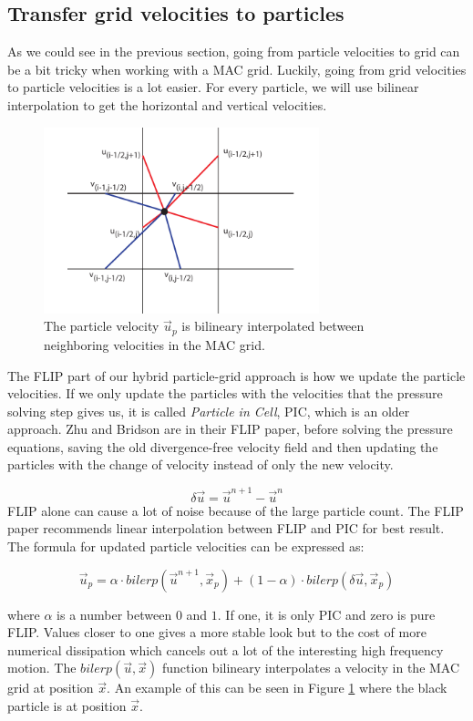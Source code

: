 \subsection{Transfer grid velocities to particles}

As we could see in the previous section, going from particle velocities to grid can be a bit tricky when working with a MAC grid. Luckily, going from grid velocities to particle velocities is a lot easier. For every particle, we will use bilinear interpolation to get the horizontal and vertical velocities.

\begin{figure}[ht!]
\centering
\includegraphics[width=80mm]{img/splat.pdf}
\caption{The particle velocity $\vec{u}_p$ is bilineary interpolated between neighboring velocities in the MAC grid.}
\label{gridparticlesfig}
\end{figure}
\noindent
The FLIP part of our hybrid particle-grid approach is how we update the particle velocities. If we only update the particles with the velocities that the pressure solving step gives us, it is called \emph{Particle in Cell}, PIC, which is an older approach. Zhu and Bridson \cite{zhu} are in their FLIP paper, before solving the pressure equations, saving the old divergence-free velocity field and then updating the particles with the change of velocity instead of only the new velocity.

\begin{equation}
\delta \vec{u} = \vec{u}^{n+1} - \vec{u}^n
\end{equation}
\noindent
FLIP alone can cause a lot of noise because of the large particle count. The FLIP paper recommends linear interpolation between FLIP and PIC for best result. The formula for updated particle velocities can be expressed as:

\begin{equation}
\vec{u}_p = \alpha \cdot bilerp(\vec{u}^{n+1}, \vec{x}_p) + (1-\alpha) \cdot bilerp(\delta \vec{u},\vec{x}_p)
\label{flipeq}
\end{equation}

where $\alpha$ is a number between $0$ and $1$. If one, it is only PIC and zero is pure FLIP. Values closer to one gives a more stable look but to the cost of more numerical dissipation which cancels out a lot of the interesting high frequency motion. The $bilerp(\vec{u}, \vec{x})$ function bilineary interpolates a velocity in the MAC grid at position $\vec{x}$. An example of this can be seen in Figure \ref{gridparticlesfig} where the black particle is at position $\vec{x}$.
